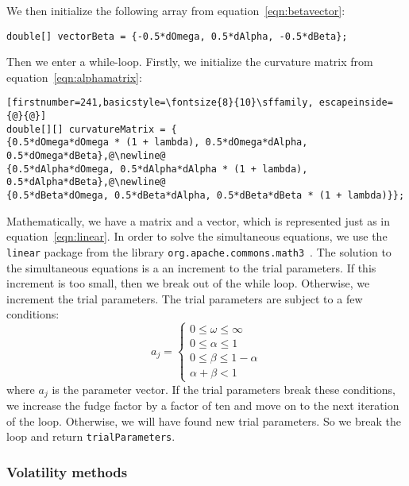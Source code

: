 \documentclass[../Dissertation.tex]{subfiles}
\begin{document}
We then initialize the following array from equation~\ref{eqn:betavector}: 
\begin{lstlisting}[firstnumber = 236]
	double[] vectorBeta = {-0.5*dOmega, 0.5*dAlpha, -0.5*dBeta};
\end{lstlisting}

Then we enter a while-loop.
Firstly, we initialize the curvature matrix from equation~\ref{eqn:alphamatrix}:
\begin{lstlisting}[firstnumber=241,basicstyle=\fontsize{8}{10}\sffamily, escapeinside={@}{@}]
double[][] curvatureMatrix = {
{0.5*dOmega*dOmega * (1 + lambda), 0.5*dOmega*dAlpha, 0.5*dOmega*dBeta},@\newline@
{0.5*dAlpha*dOmega, 0.5*dAlpha*dAlpha * (1 + lambda), 0.5*dAlpha*dBeta},@\newline@
{0.5*dBeta*dOmega, 0.5*dBeta*dAlpha, 0.5*dBeta*dBeta * (1 + lambda)}};
\end{lstlisting}

Mathematically, we have a matrix and a vector, which is represented just as in equation~\ref{eqn:linear}.
In order to solve the simultaneous equations, we use the \lstinline|linear| package from the library \lstinline|org.apache.commons.math3|~\cite{Apache:Math3}.
The solution to the simultaneous equations is a an increment to the trial parameters.
If this increment is too small, then we break out of the while loop.
Otherwise, we increment the trial parameters.
The trial parameters are subject to a few conditions: 
				\begin{equation}
					\label{eqn:parameterconditions}
					a_j = \begin{cases}
						0 \leq \omega \leq \infty\\
						0 \leq \alpha \leq 1\\
						0 \leq \beta \leq 1-\alpha\\
						\alpha + \beta < 1
						\end{cases}
				\end{equation}
where $a_j$ is the parameter vector.
If the trial parameters break these conditions, we increase the fudge factor by a factor of ten and move on to the next iteration of the loop.
Otherwise, we will have found new trial parameters.
So we break the loop and return \lstinline|trialParameters|.

\subsubsection{Volatility methods}
\end{document}
